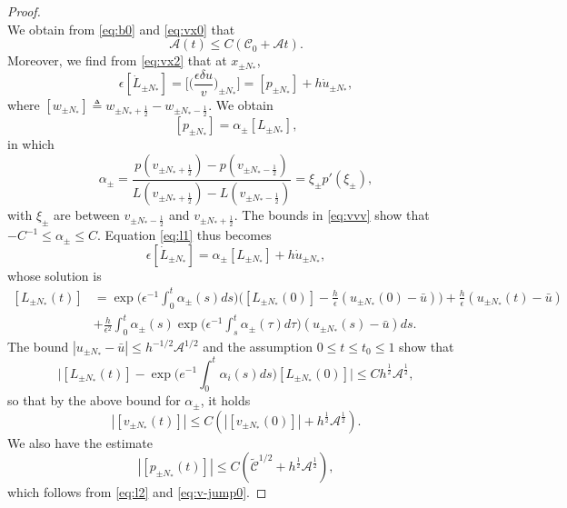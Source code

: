 \documentclass[a4paper,oneside,11pt]{article}
\numberwithin{equation}{section}
\begin{document}
\begin{proof}
\begin{equation}
\end{equation}
We obtain from \eqref{eq:b0} and \eqref{eq:vx0} that
 \begin{equation}\label{eq:est-a0}
  \mathscr{A}(t)\leq C(\mathscr{C}_0+\mathscr{A}t).
\end{equation}
Moreover, we find from \eqref{eq:vx2} that at \(x_{\pm N_* }\),
\begin{equation}\label{eq:l1}
  \epsilon[\dot{L}_{\pm N_* }]=\Big[\big(\frac{\epsilon\delta u}{v}\big)_{\pm N_* }\Big]=[p_{\pm N_* }]+h\dot{u}_{\pm N_* },
\end{equation}
where \([w_{\pm N_* }]\triangleq w_{\pm N_* +\frac12}-w_{\pm N_* -\frac12}\). We obtain
\begin{equation}\label{eq:l2}
 [p_{\pm N_* }]=\alpha_\pm[L_{\pm N_* }],
\end{equation}
in which 
\begin{equation}\label{eq:l3}
 \alpha_{\pm}=\frac{p(v_{\pm N_* +\frac12})-p(v_{\pm N_* -\frac12})}{L(v_{\pm N_* +\frac12})-L(v_{\pm N_* -\frac12})}=\xi_\pm p'(\xi_\pm),
\end{equation}
with $\xi_\pm$ are between $v_{\pm N_* -\frac12}$ and $v_{\pm N_* +\frac12}$. 
The bounds in \eqref{eq:vvv} show that $-C^{-1}\leq\alpha_\pm\leq C$. Equation \eqref{eq:l1} thus becomes
\begin{equation}\label{eq:l4}
  \epsilon[\dot{L}_{\pm N_* }]=\alpha_\pm[L_{\pm N_* }]+h\dot{u}_{\pm N_* },
\end{equation}
whose solution is
\[\begin{aligned}
[L_{\pm N_* }(t)]& =\exp\Big(\epsilon^{-1}\int_{0}^{t}\alpha_{\pm}(s)ds\Big)\Big([L_{\pm N_* }(0)]-\frac{h}{\epsilon}(u_{\pm N_* }(0)-\bar u)\Big)+\frac{h}{\epsilon}(u_{\pm N_* }(t) -\bar u) \\
&+\frac{h}{\epsilon^{2}}\int_{0}^{t}\alpha_{\pm}(s)\exp\Big(\epsilon^{-1}\int_{s}^{t}\alpha_{\pm}(\tau)d\tau\Big)(u_{\pm N_* }(s) -\bar u)ds.
\end{aligned}\]
The bound \(|u_{\pm N_* }-\bar u|\leq h^{-1/2}\mathscr{A}^{1/2}\) and the assumption $0\leq t\leq t_0\leq 1$ show that
\begin{equation}\label{eq:lnv-jump0}\Big|[L_{\pm N_* }(t)]-\exp\Big(e^{-1}\int_{0}^{t}\alpha_{i}(s)ds\Big)[L_{\pm N_* }(0)]\Big|\leq Ch^{\frac12}\mathscr{A}^{\frac12},\end{equation}
so that by the above bound for \(\alpha_\pm\), it holds
\begin{equation}\label{eq:v-jump0}\left|[v_{\pm N_* }(t)]\right|\leq C(\left|[v_{\pm N_* }(0)]\right|+h^{\frac12}\mathscr{A}^{\frac12}).\end{equation}
We also have the estimate
\begin{equation}\label{eq220}
|[p_{\pm N_* }(t)]|\leq C(\tilde{\mathscr{C}}^{1/2}+h^{\frac12}\mathscr{A}^{\frac12}),
\end{equation}
which follows from \eqref{eq:l2} and \eqref{eq:v-jump0}. 




\end{proof}
\end{document}
